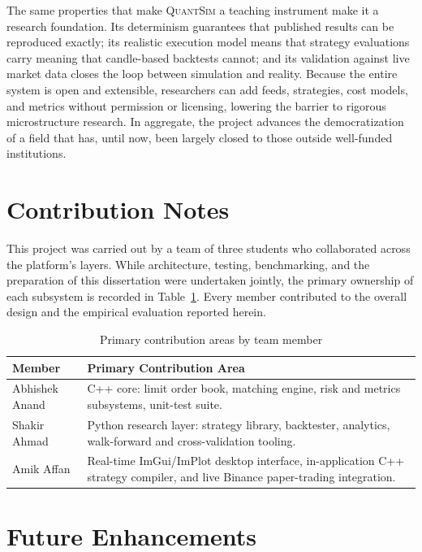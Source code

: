 \documentclass[12pt,oneside,a4paper]{report}
\newcommand{\quantsim}{\textsc{QuantSim}}
\begin{document}
The same properties that make \quantsim{} a teaching instrument make it a research foundation. Its determinism guarantees that published results can be reproduced exactly; its realistic execution model means that strategy evaluations carry meaning that candle-based backtests cannot; and its validation against live market data closes the loop between simulation and reality. Because the entire system is open and extensible, researchers can add feeds, strategies, cost models, and metrics without permission or licensing, lowering the barrier to rigorous microstructure research. In aggregate, the project advances the democratization of a field that has, until now, been largely closed to those outside well-funded institutions.

\section{Contribution Notes}
\label{sec:contributions}

This project was carried out by a team of three students who collaborated across the platform's layers. While architecture, testing, benchmarking, and the preparation of this dissertation were undertaken jointly, the primary ownership of each subsystem is recorded in Table~\ref{tab:contrib}. Every member contributed to the overall design and the empirical evaluation reported herein.

\begin{table}[H]
\centering
\caption{Primary contribution areas by team member}
\label{tab:contrib}
\small
\begin{tabular}{p{1.9in}p{3.1in}}
\toprule
\textbf{Member} & \textbf{Primary Contribution Area} \\
\midrule
Abhishek Anand & C++ core: limit order book, matching engine, risk and metrics subsystems, unit-test suite. \\
Shakir Ahmad & Python research layer: strategy library, backtester, analytics, walk-forward and cross-validation tooling. \\
Amik Affan & Real-time ImGui/ImPlot desktop interface, in-application C++ strategy compiler, and live Binance paper-trading integration. \\
\bottomrule
\end{tabular}
\end{table}

\section{Future Enhancements}
\label{sec:future}
\end{document}
